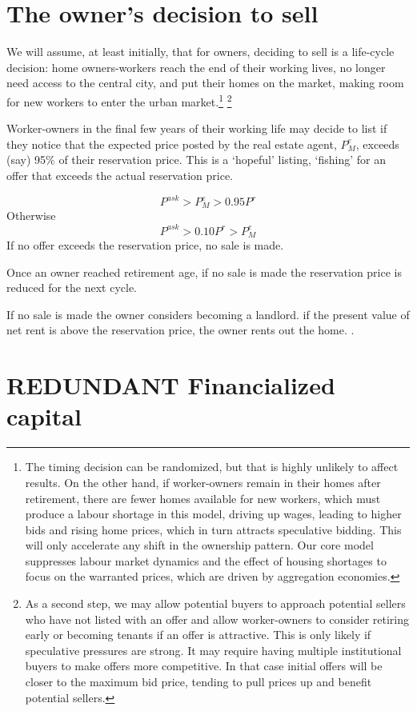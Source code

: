 \section{The owner's decision to sell}
We will assume, at least initially, that for owners, deciding to sell is a life-cycle decision: home owners-workers  reach the end of their working lives, no longer need access to the central city, and put their homes on the market, making room for new workers to enter the urban market.\footnote{The timing decision can be randomized, but that is highly unlikely to affect results. On the other hand, 
\color{red}
if worker-owners remain in their homes after retirement, there are fewer homes available for new workers, which must produce a labour shortage in this model, driving up wages, leading to higher bids and rising home prices, which in turn attracts  speculative bidding. This will only accelerate any shift in the ownership pattern. Our core model suppresses labour market dynamics and the effect of housing shortages to focus on the warranted prices, which are driven by aggregation economies. 
\color{black}} 
\footnote{\color{blue}As a second step, we may allow potential buyers  to approach potential sellers who have not listed with an offer and allow worker-owners to consider retiring early or becoming tenants if an offer is attractive.  This is only likely if speculative pressures are strong. It may require having multiple institutional buyers to make offers more competitive. In that case initial offers will be closer to the maximum bid price, tending to pull prices up and benefit potential sellers.\color{black}}  

Worker-owners in the final few years of their working life may decide to  list if  they notice that the expected price posted by the real estate agent, $P_M^e$,  exceeds (say) 95\% of their reservation price. This is a `hopeful' listing, `fishing' for an offer that exceeds the actual reservation price.

\[P^{ask}>P_M^e> 0.95 P^r\]
Otherwise
\[P^{ask}> 0.10P^r>P_M^e\]
If no offer exceeds the reservation price, no sale is made.

Once an owner reached retirement age, if no sale is made the reservation price is reduced for the next cycle.

If no sale is made the owner considers becoming a landlord. if the present value of net rent is above the reservation price, the owner rents out the home. .

\section{REDUNDANT Financialized capital}

